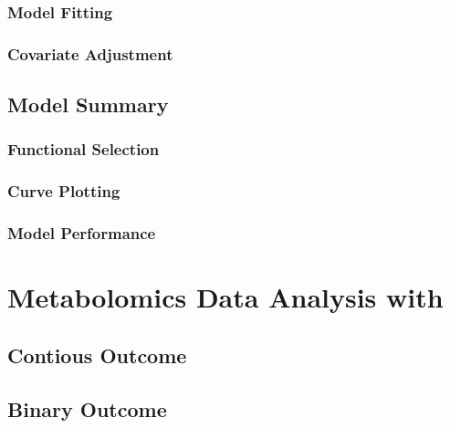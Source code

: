 \documentclass[
]{jss}
\begin{document}
\hypertarget{model-fitting-1}{%
\subsubsection{Model Fitting}\label{model-fitting-1}}

\hypertarget{covariate-adjustment}{%
\subsubsection{Covariate Adjustment}\label{covariate-adjustment}}

\hypertarget{model-summary}{%
\subsection{Model Summary}\label{model-summary}}

\hypertarget{functional-selection}{%
\subsubsection{Functional Selection}\label{functional-selection}}

\hypertarget{curve-plotting}{%
\subsubsection{Curve Plotting}\label{curve-plotting}}

\hypertarget{model-performance}{%
\subsubsection{Model Performance}\label{model-performance}}

\section[Metabolomics Data Analysis with BHAM]{Metabolomics Data
Analysis with }\label{sec:analysis}

\hypertarget{contious-outcome}{%
\subsection{Contious Outcome}\label{contious-outcome}}

\hypertarget{binary-outcome}{%
\subsection{Binary Outcome}\label{binary-outcome}}
\end{document}

